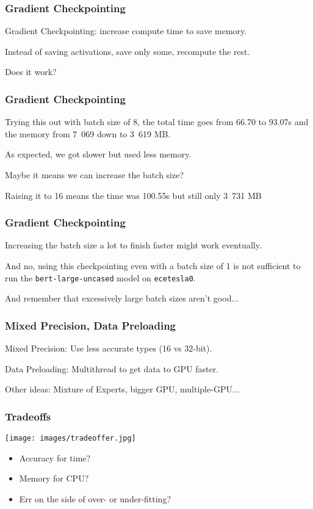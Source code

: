 \begin{frame}
\frametitle{Gradient Checkpointing}

\alert{Gradient Checkpointing}: increase compute time to save memory.

Instead of saving activations, save only some, recompute the rest.

Does it work?

\end{frame}

\begin{frame}
\frametitle{Gradient Checkpointing}

Trying this out with batch size of 8, the total time goes from 66.70 to 93.07s and the memory from 7~069 down to 3~619 MB. 

As expected, we got slower but used less memory. 

Maybe it means we can increase the batch size? 

Raising it to 16 means the time was  100.55s but still only 3~731 MB


\end{frame}

\begin{frame}
\frametitle{Gradient Checkpointing}

Increasing the batch size a lot to finish faster might work eventually. 

And no, using this checkpointing even with a batch size of 1 is not sufficient to run the \texttt{bert-large-uncased} model on \texttt{ecetesla0}.

And remember that excessively large batch sizes aren't good...

\end{frame}

\begin{frame}
\frametitle{Mixed Precision, Data Preloading}

\alert{Mixed Precision}: Use less accurate types (16 vs 32-bit).

\alert{Data Preloading}: Multithread to get data to GPU faster.

Other ideas: Mixture of Experts, bigger GPU, multiple-GPU...

\end{frame}

\begin{frame}
\frametitle{Tradeoffs}
\begin{multicols}{2}
\texttt{[image: images/tradeoffer.jpg]}
\columnbreak
\begin{itemize}
\item Accuracy for time? \\[5em]

\item Memory for CPU? \\[5em]

\item Err on the side of over- or under-fitting?
\end{itemize}
\end{multicols}

\end{frame}

